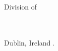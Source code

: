 \vfill



\noindent 
\mydepartment\\
Division of \division\\
\ifx\researchgroup\undefined\else\researchgroup\\\fi
\chalIgu\\

\vskip 1.5cm


\noindent
Dublin, Ireland \currentyear.
